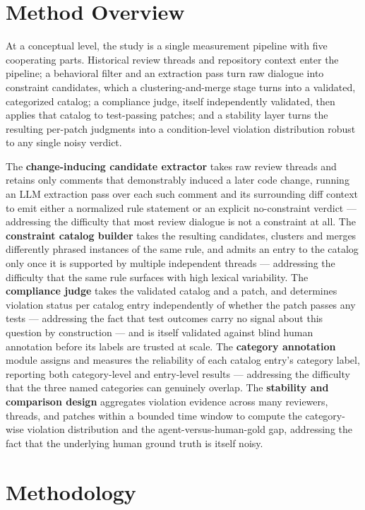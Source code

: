 \documentclass[11pt]{article}
\begin{document}
\section{Method Overview}

At a conceptual level, the study is a single measurement pipeline with five cooperating parts. Historical review threads and repository context enter the pipeline; a behavioral filter and an extraction pass turn raw dialogue into constraint candidates, which a clustering-and-merge stage turns into a validated, categorized catalog; a compliance judge, itself independently validated, then applies that catalog to test-passing patches; and a stability layer turns the resulting per-patch judgments into a condition-level violation distribution robust to any single noisy verdict.

The \textbf{change-inducing candidate extractor} takes raw review threads and retains only comments that demonstrably induced a later code change, running an LLM extraction pass over each such comment and its surrounding diff context to emit either a normalized rule statement or an explicit no-constraint verdict --- addressing the difficulty that most review dialogue is not a constraint at all. The \textbf{constraint catalog builder} takes the resulting candidates, clusters and merges differently phrased instances of the same rule, and admits an entry to the catalog only once it is supported by multiple independent threads --- addressing the difficulty that the same rule surfaces with high lexical variability. The \textbf{compliance judge} takes the validated catalog and a patch, and determines violation status per catalog entry independently of whether the patch passes any tests --- addressing the fact that test outcomes carry no signal about this question by construction --- and is itself validated against blind human annotation before its labels are trusted at scale. The \textbf{category annotation} module assigns and measures the reliability of each catalog entry's category label, reporting both category-level and entry-level results --- addressing the difficulty that the three named categories can genuinely overlap. The \textbf{stability and comparison design} aggregates violation evidence across many reviewers, threads, and patches within a bounded time window to compute the category-wise violation distribution and the agent-versus-human-gold gap, addressing the fact that the underlying human ground truth is itself noisy.

\section{Methodology}
\end{document}
